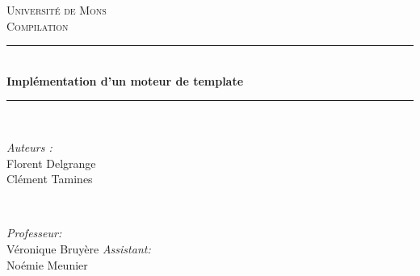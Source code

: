 \documentclass[a4paper,10pt]{article}
\begin{document}
\begin{titlepage}

\newcommand{\HRule}{\rule{\linewidth}{0.5mm}} %

\center %
 

\textsc{\LARGE Université de Mons}\\[1.5cm] %
\textsc{\Large Compilation }\\[0.5cm] %


\HRule \\[0.4cm]
{ \huge \bfseries Implémentation d'un moteur de template}\\[0.4cm] %
\HRule \\[1.5cm]
 

\begin{minipage}{0.4\textwidth}
\begin{flushleft} \large
\emph{Auteurs :}\\
Florent Delgrange \\
Clément Tamines
\end{flushleft}
\end{minipage}
~
\begin{minipage}{0.4\textwidth}
\begin{flushright} \large
\emph{Professeur:} \\
Véronique Bruyère
\emph{Assistant:} \\
Noémie Meunier
\end{flushright}
\end{minipage}\\[4cm]



\end{titlepage}
\end{document}
